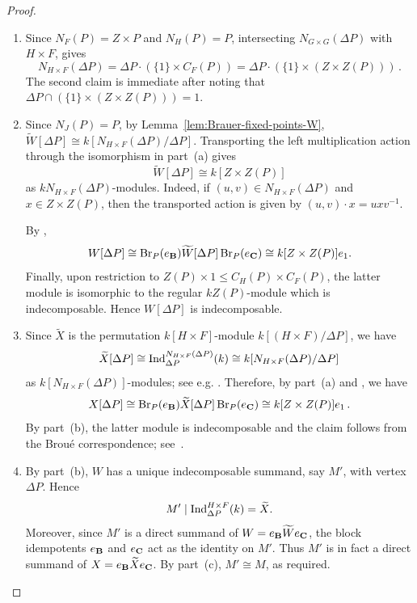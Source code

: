 \begin{proof}
   \begin{enumerate}[label=\rm(\alph*)]
    \item Since $N_F(P)=Z\times P$ and $N_H(P)=P$, intersecting $N_{G\times G}(\Delta P)$ with $H\times F$, \cite[Proposition 2.4(a)]{BoltjePerepelitsky} gives
    \[
    N_{H\times F}(\Delta P)
    =\Delta P\cdot(\{1\}\times C_F(P))
    =\Delta P\cdot(\{1\}\times(Z\times Z(P)))\,.
    \] 
The second claim is immediate after noting that $\Delta P\cap (\{1\}\times(Z\times Z(P)))=1$.
\item Since $N_J(P)=P$, by Lemma~\ref{lem:Brauer-fixed-points-W}, $\widetilde{W}[\Delta P]\cong k[N_{H\times F}(\Delta P)/\Delta P]$. Transporting the left multiplication action through the isomorphism in part~{\rm (a)} gives
\[
\widetilde{W}[\Delta P]\cong k[Z\times Z(P)]
\]
as $kN_{H\times F}(\Delta P)$-modules. Indeed, if $(u,v)\in N_{H\times F}(\Delta P)$ and $x\in Z\times Z(P)$, then the
transported action is given by $(u,v)\cdot x=uxv^{-1}$.

By \cite[Lemma~3.7]{BoltjePerepelitsky},
\[
W[\Delta P]\cong\operatorname{Br}_P(e_{\mathbf{B}})\widetilde{W}[\Delta P]\operatorname{Br}_P(e_{\mathbf{C}})\cong k[Z\times Z(P)]e_1.
\]
Finally, upon restriction to $Z(P)\times 1\leq C_H(P)\times C_F(P)$, the latter module is isomorphic to the regular $kZ(P)$-module which is indecomposable. Hence $W[\Delta P]$ is indecomposable.

\item Since $\widetilde{X}$ is the permutation $k[H\times F]$-module $k[(H\times F)/\Delta P]$, we have  
    \[
    \widetilde{X}[\Delta P]\cong \operatorname{Ind}_{\Delta P}^{N_{H\times F}(\Delta P)}(k)\cong k[N_{H\times F}(\Delta P)/\Delta P]
    \]
    as $k[N_{H\times F}(\Delta P)]$-modules; see e.g. \cite[Corollary 5.8.4]{LinckelmannVol1}.
Therefore, by part~{\rm (a)} and \cite[Lemma 3.7]{BoltjePerepelitsky}, we have 
\[
X[\Delta P]\cong \operatorname{Br}_P(e_{\mathbf{B}})\widetilde{X}[\Delta P]\operatorname{Br}_P(e_{\mathbf{C}})\cong k[Z\times Z(P)]e_1\,.
\]
By part~{\rm (b)}, the latter module is indecomposable and the claim follows from the Brou\'{e} correspondence; see~\cite[Theorem (3.2) and (3.4)]{BrouePperm85}. 
\item By part~{\rm (b)}, $W$ has a unique
indecomposable summand, say $M'$, with vertex $\Delta P$. Hence
\[
M'\mid \operatorname{Ind}_{\Delta P}^{H\times F}(k)=\widetilde X.
\]
Moreover, since $M'$ is a direct summand of
$W=e_{\mathbf{B}}\widetilde W e_{\mathbf{C}}$, the block idempotents $e_{\mathbf{B}}$ and $e_{\mathbf{C}}$
act as the identity on $M'$. Thus $M'$ is in fact a direct summand of $X=e_{\mathbf{B}}\widetilde X e_{\mathbf{C}}$. By part~{\rm (c)}, $M'\cong M$, as required.
    \end{enumerate}
\end{proof}


